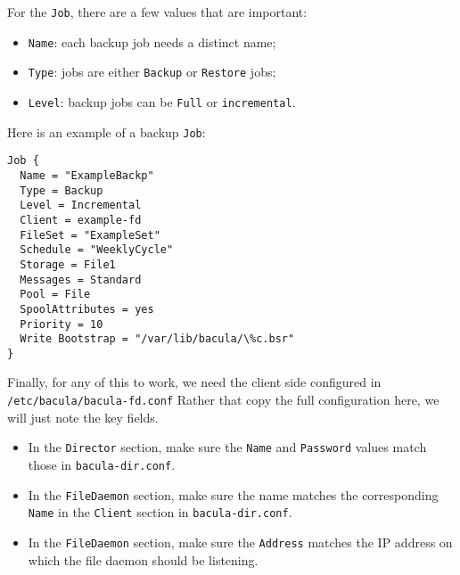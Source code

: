 \documentclass{article}   	%
\begin{document}
For the \texttt{Job}, there are a few values that are important:

\begin{itemize}
	\item \texttt{Name}: each backup job needs a distinct name;
	\item \texttt{Type}: jobs are either \texttt{Backup} or \texttt{Restore} jobs;
	\item \texttt{Level}: backup jobs can be \texttt{Full} or \texttt{incremental}.	
\end{itemize}

Here is an example of a backup \texttt{Job}:

\begin{verbatim}
Job {
  Name = "ExampleBackp"
  Type = Backup
  Level = Incremental
  Client = example-fd
  FileSet = "ExampleSet"
  Schedule = "WeeklyCycle"
  Storage = File1
  Messages = Standard
  Pool = File
  SpoolAttributes = yes
  Priority = 10
  Write Bootstrap = "/var/lib/bacula/\%c.bsr"
}

\end{verbatim}

Finally, for any of this to work, we need the client side configured in \texttt{/etc/bacula/bacula-fd.conf} Rather that copy the full configuration here, we will just note the 
key fields.

\begin{itemize}
  \item In the \texttt{Director} section, make sure the \texttt{Name} and \texttt{Password} values match those in \texttt{bacula-dir.conf}.
  \item In the \texttt{FileDaemon} section, make sure the name matches the corresponding \texttt{Name} in the \texttt{Client} section
  in \texttt{bacula-dir.conf}.
  \item In the \texttt{FileDaemon} section, make sure the \texttt{Address} matches the IP address on which the file daemon should be listening.
\end{itemize}
\end{document}
